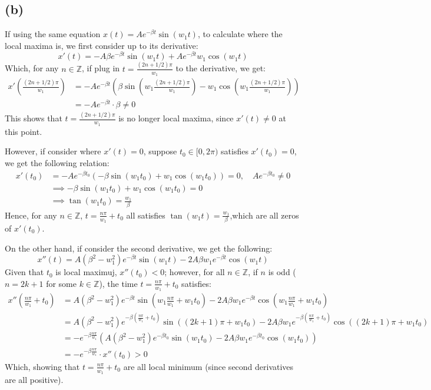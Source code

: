 \documentclass{article}
\newcommand{\ZZ}{\mathbb{Z}}
\begin{document}
\subsection*{(b)}
If using the same equation $x(t)=Ae^{-\beta t}\sin(w_1t)$, to calculate where the local maxima is, we first consider up to its derivative:
\begin{equation}
    x'(t) = -A\beta e^{-\beta t}\sin(w_1 t)+Ae^{-\beta t}w_1\cos(w_1 t)
\end{equation}
Which, for any $n \in \ZZ$, if plug in $t=\frac{(2n+1/2)\pi}{w_1}$ to the derivative, we get:
\begin{align}
    x'\left(\frac{(2n+1/2)\pi}{w_1}\right) &= -Ae^{-\beta t}\left(\beta\sin\left(w_1\frac{(2n+1/2)\pi}{w_1}\right)-w_1\cos\left(w_1\frac{(2n+1/2)\pi}{w_1}\right)\right)\\
    &= -Ae^{-\beta t}\cdot \beta \neq 0
\end{align}
This shows that $t=\frac{(2n+1/2)\pi}{w_1}$ is no longer local maxima, since $x'(t)\neq 0$ at this point.

\hfil

However, if consider where $x'(t)=0$, suppose $t_0 \in [0,2\pi)$ satisfies $x'(t_0)=0$, we get the following relation:
\begin{align}
    x'(t_0)&=-Ae^{-\beta t_0}(-\beta\sin(w_1 t_0)+w_1\cos(w_1 t_0)) = 0,\quad Ae^{-\beta t_0}\neq 0\\
    &\implies -\beta\sin(w_1 t_0)+w_1\cos(w_1 t_0)=0\\
    &\implies \tan(w_1 t_0)=\frac{w_1}{\beta}
\end{align}
Hence, for any $n \in \ZZ$, $t=\frac{n\pi}{w_1}+t_0$ all satisfies $\tan(w_1 t)=\frac{w_1}{\beta}$,which are all zeros of $x'(t_0)$.

On the other hand, if consider the second derivative, we get the following:
\begin{equation}
    x''(t) = A(\beta^2-w_1^2)e^{-\beta t}\sin(w_1 t)-2A\beta w_1e^{-\beta t}\cos(w_1 t)
\end{equation}
Given that $t_0$ is local maximuj, $x''(t_0)<0$; however, for all $n\in\ZZ$, if $n$ is odd ($n=2k+1$ for some $k\in \ZZ$), the time $t=\frac{n\pi}{w_1}+t_0$ satisfies:
\begin{align}
    x''\left(\frac{n\pi}{w_1}+t_0\right)&=A(\beta^2-w_1^2)e^{-\beta t}\sin\left(w_1\frac{n\pi}{w_1}+w_1t_0\right) - 2A\beta w_1e^{-\beta t}\cos\left(w_1\frac{n\pi}{w_1}+w_1t_0\right)\\
    &= A(\beta^2-w_1^2)e^{-\beta (\frac{n\pi}{w_1}+t_0)}\sin((2k+1)\pi +w_1t_0)-2A\beta w_1e^{-\beta (\frac{n\pi}{w_1}+t_0)}\cos((2k+1)\pi +w_1t_0)\\
    &= -e^{-\beta\frac{n\pi}{w_1}}\left(A(\beta^2-w_1^2)e^{-\beta t_0}\sin(w_1t_0)-2A\beta w_1e^{-\beta t_0}\cos(w_1 t_0)\right)\\
    &= -e^{-\beta \frac{n\pi}{w_1}}\cdot x''(t_0)>0
\end{align}
Which, showing that $t=\frac{n\pi}{w_1}+t_0$ are all local minimum (since second derivatives are all positive). 
\end{document}
